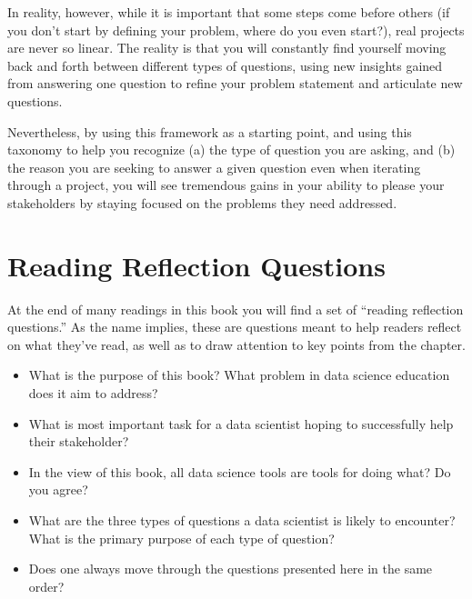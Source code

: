 \documentclass[letterpaper,10pt,english]{jupyterBook}
\begin{document}
\sphinxAtStartPar
In reality, however, while it is important that some steps come before others (if you don’t start by defining your problem, where do you even start?), real projects are never so linear. The reality is that you will constantly find yourself moving back and forth between different types of questions, using new insights gained from answering one question to refine your problem statement and articulate new questions.

\sphinxAtStartPar
Nevertheless, by using this framework as a starting point, and using this taxonomy to help you recognize (a) the type of question you are asking, and (b) the reason you are seeking to answer a given question even when iterating through a project, you will see tremendous gains in your ability to please your stakeholders by staying focused on the problems they need addressed.


\section{Reading Reflection Questions}
\label{\detokenize{10_introduction/10_our_approach:reading-reflection-questions}}
\sphinxAtStartPar
At the end of many readings in this book you will find a set of “reading reflection questions.” As the name implies, these are questions meant to help readers reflect on what they’ve read, as well as to draw attention to key points from the chapter.
\begin{itemize}
\item {} 
\sphinxAtStartPar
What is the purpose of this book? What problem in data science education does it aim to address?

\item {} 
\sphinxAtStartPar
What is  most important task for a data scientist hoping to successfully help their stakeholder?

\item {} 
\sphinxAtStartPar
In the view of this book, all data science tools are tools for doing what? Do you agree?

\item {} 
\sphinxAtStartPar
What are the three types of questions a data scientist is likely to encounter? What is the primary purpose of each type of question?

\item {} 
\sphinxAtStartPar
Does one always move through the questions presented here in the same order?

\end{itemize}
\end{document}
